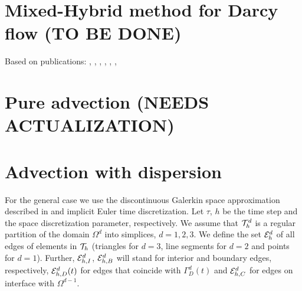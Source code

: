\section{Mixed-Hybrid method for Darcy flow (TO BE DONE)}
\label{MHmethod}
Based on publications: \cite{arbogast_nonlinear_1996}, \cite{maryska_mixed-hybrid_1995}, \cite{maryska_schur_2000}, \cite{vohralik_mixed-hybrid_2000}, \cite{VogelBrezina2010},
\cite{GerkeGenuchten1993a}, \cite{brezina_mixed-hybrid_2010}



\section{Pure advection (NEEDS ACTUALIZATION)}
\label{Convection}


\section{Advection with dispersion}
\label{DGmethod}

For the general case we use the discontinuous Galerkin space approximation described in \cite{ern_stephansen_zunino} and implicit Euler time discretization.
Let $\tau$, $h$ be the time step and the space discretization parameter, respectively.
We assume that $\mathcal T_h^d$ is a regular partition of the domain $\Omega^d$ into simplices, $d=1,2,3$.
We define the set $\mathcal E_h^d$ of all edges of elements in $\mathcal T_h$ (triangles for $d=3$, line segments for $d=2$ and points for $d=1$).
Further, $\mathcal E_{h,I}^d$, $\mathcal E_{h,B}^d$ will stand for interior and boundary edges, respectively, $\mathcal E_{h,D}^d(t)$ for edges that coincide with $\Gamma_D^d(t)$ and $\mathcal E_{h,C}^d$ for edges on interface with $\Omega^{d-1}$.

